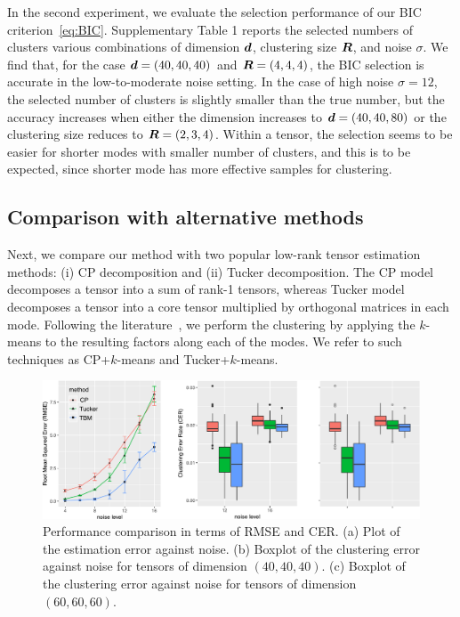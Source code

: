 \documentclass{article}
\begin{document}
In the second experiment, we evaluate the selection performance of our BIC criterion~\eqref{eq:BIC}. Supplementary Table 1 reports the selected numbers of clusters various combinations of dimension $\bm{d}$, clustering size $\bm{R}$, and noise $\sigma$. We find that, for the case $\bm{d}=(40,40,40)$ and $\bm{R}=(4,4,4)$, the BIC selection is accurate in the low-to-moderate noise setting. In the case of high noise $\sigma=12$, the 
selected number of clusters is slightly smaller than the true number, but the accuracy increases when either the dimension increases to $\bm{d}=(40,40,80)$ or the clustering size reduces to $\bm{R}=(2,3,4)$. Within a tensor, the selection seems to be easier for shorter modes with smaller number of clusters, and this is to be expected, since shorter mode has more effective samples for clustering. 


\subsection{Comparison with alternative methods}
Next, we compare our method with two popular low-rank tensor estimation methods: (i) CP decomposition and (ii) Tucker decomposition. The CP model decomposes a tensor into a sum of rank-1 tensors, whereas Tucker model decomposes a tensor into a core tensor multiplied by orthogonal matrices in each mode. Following the literature~\cite{chi2018provable}, we perform the clustering by applying the $k$-means to the resulting factors along each of the modes. We refer to such techniques as CP+$k$-means and Tucker+$k$-means. 

\begin{figure}
	\centering
\includegraphics[width=\textwidth]{figures/test}
	\caption{Performance comparison in terms of RMSE and CER. (a) Plot of the estimation error against noise. (b) Boxplot of the clustering error against noise for tensors of dimension $(40,40,40)$. (c) Boxplot of the clustering error against noise for tensors of dimension $(60,60,60)$.} \label{fig4}
\end{figure}
\end{document}
